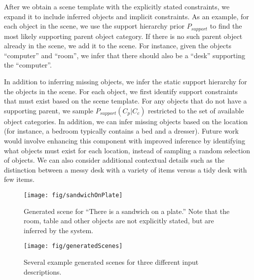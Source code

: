 \documentclass{sigchi}
\begin{document}
After we obtain a scene template with the explicitly stated constraints, we expand it to include inferred objects and implicit constraints.  As an example, for each object in the scene, we use the support hierarchy prior $P_\textit{support}$ to find the most likely supporting parent object category.  If there is no such parent object already in the scene, we add it to the scene.  For instance, given the objects ``computer'' and ``room'', we infer that there should also be a ``desk'' supporting the ``computer''.

In addition to inferring missing objects, we infer the static support hierarchy for the objects in the scene.  For each object, we first identify support constraints that must exist based on the scene template.  For any objects that do not have a supporting parent, we sample  $P_\textit{support}(C_p|C_c)$ restricted to the set of available object categories.  In addition, we can infer missing objects based on the location (for instance, a bedroom typically contains a bed and a dresser).  Future work would involve enhancing this component with improved inference by identifying what objects must exist for each location, instead of sampling a random selection of objects.  We can also consider additional contextual details such as the distinction between a messy desk with a variety of items versus a tidy desk with few items.

\begin{figure}
  \texttt{[image: fig/sandwichOnPlate]}
  \caption{Generated scene for ``There is a sandwich on a plate.''  Note that the room, table and other objects are not explicitly stated, but are inferred by the system.}
  \label{fig:generatedSandwich}
\end{figure}

\begin{figure*}
  \texttt{[image: fig/generatedScenes]}
  \caption{Several example generated scenes for three different input descriptions.}
  \label{fig:generatedScenes}
\end{figure*}
\end{document}
